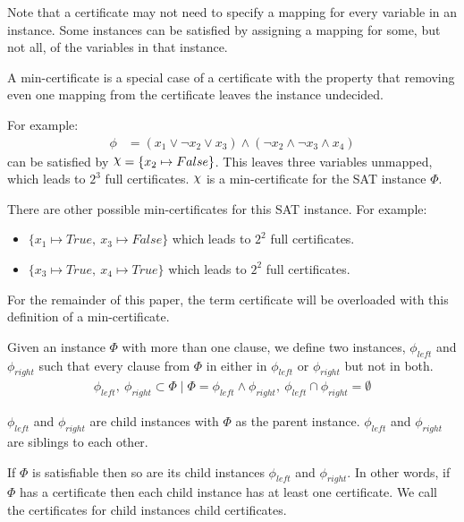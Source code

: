 Note that a certificate may not need to specify a mapping for every variable in an instance.
Some instances can be satisfied by assigning a mapping for some, but not all, of the variables in that instance.

\begin{definition}
\label{def:min-certificate}
    A min-certificate is a special case of a certificate with the property that removing even one mapping from the certificate leaves the instance undecided.
\end{definition}

For example:
\begin{align*}
    \phi & = (x_1 \lor \lnot x_2 \lor x_3) \land (\lnot x_2 \land \lnot x_3 \land x_4)
\end{align*}
can be satisfied by $ \rchi = \{ x_2 \mapsto False \} $.
This leaves three variables unmapped, which leads to $2^3$ full certificates.
$\rchi$ is a min-certificate for the SAT instance $\Phi$.

There are other possible min-certificates for this SAT instance.
For example:
\begin{itemize}
    \item $\{ x_1 \mapsto True,~ x_3 \mapsto False \}$ which leads to $2^2$ full certificates.
    \item $\{ x_3 \mapsto True,~ x_4 \mapsto True \}$ which leads to $2^2$ full certificates.
\end{itemize}

For the remainder of this paper, the term certificate will be overloaded with this definition of a min-certificate.

\begin{definition}
\label{def:child-instances}
    Given an instance $\Phi$ with more than one clause, we define two instances, $\phi_{left}$ and $\phi_{right}$ such that every clause from $\Phi$ in either in $\phi_{left}$ or $\phi_{right}$ but not in both.
    \begin{align*}
        \phi_{left},~ \phi_{right} \subset \Phi
        \mid \Phi = \phi_{left} \land \phi_{right},~
        \phi_{left} \cap \phi_{right} = \emptyset
    \end{align*}

    $\phi_{left}$ and $\phi_{right}$ are child instances with $\Phi$ as the parent instance.
    $\phi_{left}$ and $\phi_{right}$ are siblings to each other.
\end{definition}

\begin{definition}
\label{def:child-certificates}
    If $\Phi$ is satisfiable then so are its child instances $\phi_{left}$ and $\phi_{right}$.
    In other words, if $\Phi$ has a certificate then each child instance has at least one certificate.
    We call the certificates for child instances child certificates.
\end{definition}

